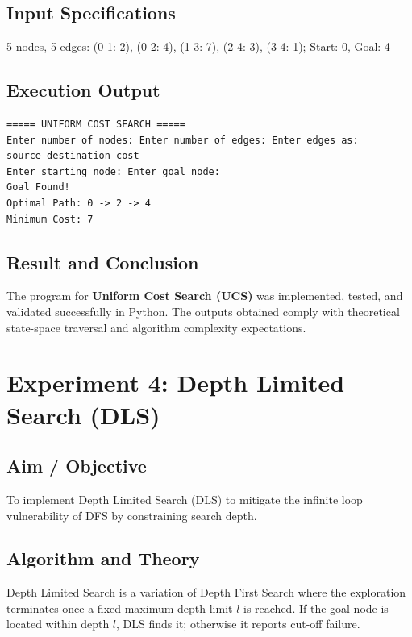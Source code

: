 \documentclass[11pt,a4paper]{report}
\begin{document}
\section{Input Specifications}
5 nodes, 5 edges: (0 1: 2), (0 2: 4), (1 3: 7), (2 4: 3), (3 4: 1); Start: 0, Goal: 4

\section{Execution Output}
\begin{tcolorbox}[colback=outputback,colframe=outputframe,title={\textbf{Terminal Output - Uniform Cost Search (UCS)}}]
\begin{verbatim}
===== UNIFORM COST SEARCH =====
Enter number of nodes: Enter number of edges: Enter edges as:
source destination cost
Enter starting node: Enter goal node: 
Goal Found!
Optimal Path: 0 -> 2 -> 4
Minimum Cost: 7
\end{verbatim}
\end{tcolorbox}

\section{Result and Conclusion}
The program for \textbf{Uniform Cost Search (UCS)} was implemented, tested, and validated successfully in Python. The outputs obtained comply with theoretical state-space traversal and algorithm complexity expectations.

\newpage

\chapter{Experiment 4: Depth Limited Search (DLS)}

\section{Aim / Objective}
To implement Depth Limited Search (DLS) to mitigate the infinite loop vulnerability of DFS by constraining search depth.

\section{Algorithm and Theory}
Depth Limited Search is a variation of Depth First Search where the exploration terminates once a fixed maximum depth limit $l$ is reached. If the goal node is located within depth $l$, DLS finds it; otherwise it reports cut-off failure.
\end{document}
